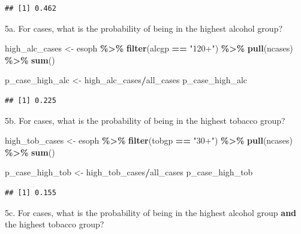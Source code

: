 \documentclass[
]{article}
\newenvironment{Shaded}{\begin{snugshade}}{\end{snugshade}}
\newcommand{\KeywordTok}[1]{\textcolor[rgb]{0.13,0.29,0.53}{\textbf{#1}}}
\newcommand{\NormalTok}[1]{#1}
\newcommand{\OperatorTok}[1]{\textcolor[rgb]{0.81,0.36,0.00}{\textbf{#1}}}
\newcommand{\StringTok}[1]{\textcolor[rgb]{0.31,0.60,0.02}{#1}}
\begin{document}
\begin{verbatim}
## [1] 0.462
\end{verbatim}

5a. For cases, what is the probability of being in the highest alcohol
group?

\begin{Shaded}
\begin{Highlighting}[]
\NormalTok{high\_alc\_cases \textless{}{-}}\StringTok{ }\NormalTok{esoph }\OperatorTok{\%\textgreater{}\%}
\StringTok{  }\KeywordTok{filter}\NormalTok{(alcgp }\OperatorTok{==}\StringTok{ "120+"}\NormalTok{) }\OperatorTok{\%\textgreater{}\%}
\StringTok{  }\KeywordTok{pull}\NormalTok{(ncases) }\OperatorTok{\%\textgreater{}\%}
\StringTok{  }\KeywordTok{sum}\NormalTok{()}

\NormalTok{p\_case\_high\_alc \textless{}{-}}\StringTok{ }\NormalTok{high\_alc\_cases}\OperatorTok{/}\NormalTok{all\_cases}
\NormalTok{p\_case\_high\_alc}
\end{Highlighting}
\end{Shaded}

\begin{verbatim}
## [1] 0.225
\end{verbatim}

5b. For cases, what is the probability of being in the highest tobacco
group?

\begin{Shaded}
\begin{Highlighting}[]
\NormalTok{high\_tob\_cases \textless{}{-}}\StringTok{ }\NormalTok{esoph }\OperatorTok{\%\textgreater{}\%}
\StringTok{  }\KeywordTok{filter}\NormalTok{(tobgp }\OperatorTok{==}\StringTok{ "30+"}\NormalTok{) }\OperatorTok{\%\textgreater{}\%}
\StringTok{  }\KeywordTok{pull}\NormalTok{(ncases) }\OperatorTok{\%\textgreater{}\%}
\StringTok{  }\KeywordTok{sum}\NormalTok{()}

\NormalTok{p\_case\_high\_tob \textless{}{-}}\StringTok{ }\NormalTok{high\_tob\_cases}\OperatorTok{/}\NormalTok{all\_cases}
\NormalTok{p\_case\_high\_tob}
\end{Highlighting}
\end{Shaded}

\begin{verbatim}
## [1] 0.155
\end{verbatim}

5c. For cases, what is the probability of being in the highest alcohol
group \textbf{and} the highest tobacco group?
\end{document}
